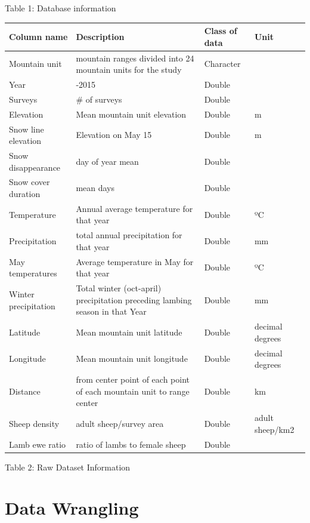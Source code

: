 \documentclass[
  12pt,
]{article}
\begin{document}
Table 1: Database information

\begin{longtable}[]{@{}
  >{\raggedright\arraybackslash}p{}
  >{\raggedright\arraybackslash}p{}
  >{\raggedright\arraybackslash}p{}
  >{\raggedright\arraybackslash}p{}@{}}
\toprule
Column name & Description & Class of data & Unit \\
\midrule
\endhead
Mountain unit & 14 mountain ranges divided into 24 mountain units for
the study & Character & \\
Year & 2000-2015 & Double & \\
Surveys & \# of surveys & Double & \\
Elevation & Mean mountain unit elevation & Double & m \\
Snow line elevation & Elevation on May 15 & Double & m \\
Snow disappearance & day of year mean & Double & \\
Snow cover duration & mean days & Double & \\
Temperature & Annual average temperature for that year & Double & ºC \\
Precipitation & total annual precipitation for that year & Double &
mm \\
May temperatures & Average temperature in May for that year & Double &
ºC \\
Winter precipitation & Total winter (oct-april) precipitation preceding
lambing season in that Year & Double & mm \\
Latitude & Mean mountain unit latitude & Double & decimal degrees \\
Longitude & Mean mountain unit longitude & Double & decimal degrees \\
Distance & from center point of each point of each mountain unit to
range center & Double & km \\
Sheep density & adult sheep/survey area & Double & adult sheep/km2 \\
Lamb ewe ratio & ratio of lambs to female sheep & Double & \\
\bottomrule
\end{longtable}

Table 2: Raw Dataset Information

\hypertarget{data-wrangling}{%
\section{Data Wrangling}\label{data-wrangling}}
\end{document}
